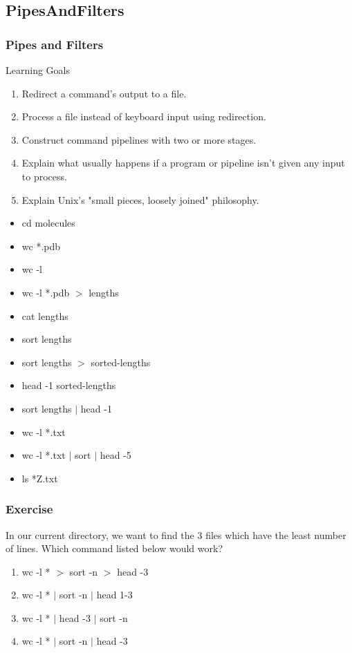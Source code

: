 \documentclass{beamer}
\begin{document}
\subsection*{PipesAndFilters}
\begin{frame}
\frametitle{Pipes and Filters}
\small{
\begin{block}{Learning Goals}
\begin{enumerate}
\item    Redirect a command's output to a file.
\item    Process a file instead of keyboard input using redirection.
\item    Construct command pipelines with two or more stages.
\item    Explain what usually happens if a program or pipeline isn't given any input to process.
\item    Explain Unix's "small pieces, loosely joined" philosophy.
\end{enumerate}
\end{block}

\begin{multicols}{2}
\begin{itemize}
\item cd molecules
\item wc *.pdb
\item wc -l
\item wc -l *.pdb $>$ lengths
\item cat lengths
\item sort lengths
\item sort lengths $>$ sorted-lengths
\item head -1 sorted-lengths
\item sort lengths $|$ head -1
\item wc -l *.txt
\item wc -l *.txt $|$ sort $|$ head -5
\item ls *Z.txt
\end{itemize}
\end{multicols}}
\end{frame}


\begin{frame}
\frametitle{Exercise}
In our current directory, we want to find the 3 files which have the least number of lines. Which command listed below would work?

\begin{enumerate}
\item wc -l * $>$ sort -n $>$ head -3
\item wc -l * $|$ sort -n $|$ head 1-3
\item wc -l * $|$ head -3 $|$ sort -n
\item wc -l * $|$ sort -n $|$ head -3
\end{enumerate}
\end{frame}
\end{document}
